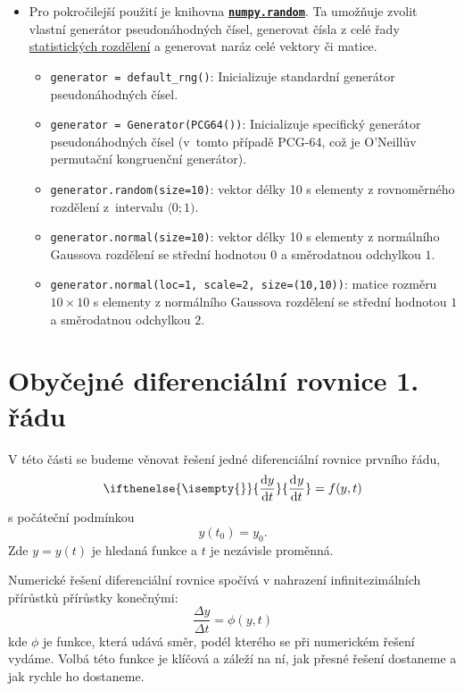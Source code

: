 \documentclass[a4paper,11pt,twoside]{article}
\renewcommand{\d}{\mathrm{d}}
\newcommand{\derivative}[3][]{\ifthenelse{\isempty{#1}}	    %
	{\frac{\d{#2}}{\d{#3}}}
	{\frac{\d^{#1}{#2}}{\d{#3}^{#1}}}
}
\def\code#1{\textnormal{\texttt{#1}}}
\def\file#1{\textnormal{\textbf{\texttt{#1}}}}
\theoremstyle{red}
\theoremstyle{green}
\begin{document}
\begin{itemize}
        \item 
            Pro pokročilejší použití je knihovna \file{\href{https://numpy.org/doc/stable/reference/random/index.html}{numpy.random}}.
            Ta umožňuje zvolit vlastní generátor pseudonáhodných čísel, generovat čísla z celé řady \href{https://numpy.org/doc/stable/reference/random/generator.html}{statistických rozdělení} a generovat naráz celé vektory či matice.
            \begin{itemize}
                \item \code{generator = default\_rng()}: Inicializuje standardní generátor pseudonáhodných čísel.
                \item \code{generator = Generator(PCG64())}: Inicializuje specifický generátor pseudonáhodných čísel (v~tomto případě PCG-64, což je O'Neillův permutační kongruenční generátor).
                \item \code{generator.random(size=10)}: vektor délky 10 s elementy z rovnoměrného rozdělení z~intervalu $\langle 0;1)$.
                \item \code{generator.normal(size=10)}: vektor délky 10 s elementy z normálního Gaussova rozdělení se střední hodnotou $0$ a směrodatnou odchylkou $1$.
                \item \code{generator.normal(loc=1, scale=2, size=(10,10))}: matice rozměru $10\times10$ s elementy z normálního Gaussova rozdělení se střední hodnotou $1$ a směrodatnou odchylkou $2$.
            \end{itemize}            
    \end{itemize}


\section{Obyčejné diferenciální rovnice 1. řádu}
\label{sec:ODR1}
    V této části se budeme věnovat řešení jedné diferenciální rovnice prvního řádu,
    \begin{equation}
        \derivative{y}{t}=f(y,t)
    \end{equation}
    s počáteční podmínkou
    \begin{equation}
        y(t_{0})=y_{0}.
    \end{equation}
    Zde $y=y(t)$ je hledaná funkce a $t$ je nezávisle proměnná.
    
    Numerické řešení diferenciální rovnice spočívá v nahrazení infinitezimálních přírůstků přírůstky konečnými:
    \begin{equation}\label{eq:Diference}
        \frac{\Delta y}{\Delta t}=\phi(y,t)
    \end{equation}
    kde $\phi$ je funkce, která udává směr, podél kterého se při numerickém řešení vydáme.
    Volbá této funkce je klíčová a záleží na ní, jak přesné řešení dostaneme a jak rychle ho dostaneme.
\end{document}
